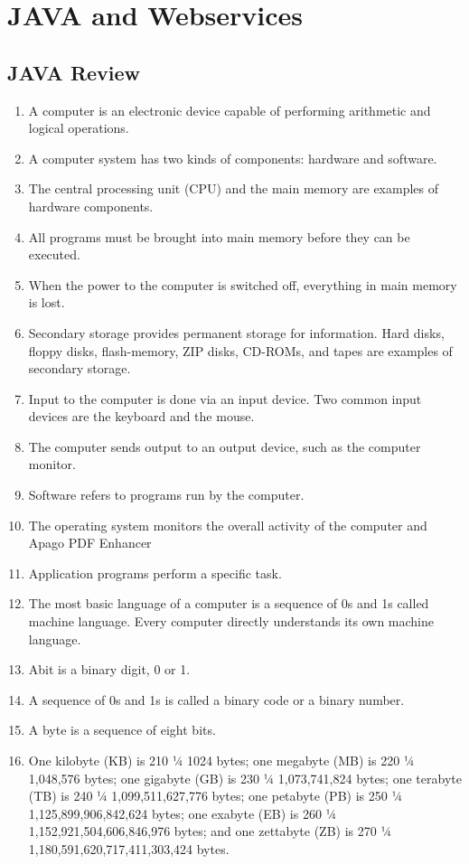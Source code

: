 \documentclass[12pt,a4paper,final,twoside,onecolumn,titlepage]{book}
\begin{document}
\chapter{JAVA and Webservices}
\section{JAVA Review}
\begin{enumerate}
\item A computer is an electronic device capable of performing arithmetic and logical operations.
\item A computer system has two kinds of components: hardware and software.
\item The central processing unit (CPU) and the main memory are examples of hardware components.
\item All programs must be brought into main memory before they can be executed.
\item When the power to the computer is switched off, everything in main memory is lost.
\item Secondary storage provides permanent storage for information. Hard disks, floppy disks, flash-memory, ZIP disks, CD-ROMs, and tapes are examples of secondary storage.
\item Input to the computer is done via an input device. Two common input devices are the keyboard and the mouse.
\item The computer sends output to an output device, such as the computer monitor.
\item Software refers to programs run by the computer.
\item The operating system monitors the overall activity of the computer and Apago PDF Enhancer
\item Application programs perform a specific task.
\item The most basic language of a computer is a sequence of 0s and 1s called machine language. Every computer directly understands its own machine language.
\item  Abit is a binary digit, 0 or 1.
\item A sequence of 0s and 1s is called a binary code or a binary number.
\item A byte is a sequence of eight bits.
\item One kilobyte (KB) is 210 1⁄4 1024 bytes; one megabyte (MB) is 220 1⁄4 1,048,576 bytes; one gigabyte (GB) is 230 1⁄4 1,073,741,824 bytes; one terabyte (TB) is 240 1⁄4 1,099,511,627,776 bytes; one petabyte (PB) is 250 1⁄4 1,125,899,906,842,624 bytes; one exabyte (EB) is 260 1⁄4 1,152,921,504,606,846,976 bytes; and one zettabyte (ZB) is 270 1⁄4 1,180,591,620,717,411,303,424 bytes.

\end{enumerate}
\end{document}
